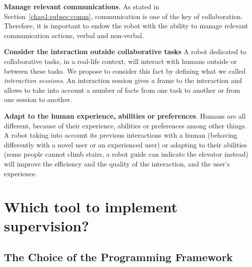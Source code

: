 \documentclass[a4paper,11pt,twoside]{StyleThese}
\begin{document}
\begin{bulletList}
	\item \textbf{Manage relevant communications}. As stated in Section~\ref{chap1:subsec:comm}, communication is one of the key of collaboration. Therefore, it is important to endow the robot with the ability to manage relevant communication actions, verbal and non-verbal.
	\item \textbf{Consider the interaction outside collaborative tasks} A robot dedicated to collaborative tasks, in a real-life context, will interact with humans outside or between these tasks. We propose to consider this fact by defining what we called \textit{interaction sessions}. An interaction session gives a frame to the interaction and allows to take into account a number of facts from one task to another or from one session to another.
	\item \textbf{Adapt to the human experience, abilities or preferences}. Humans are all different, because of their experience, abilities or preferences among other things. A robot taking into account its previous interactions with a human (\eg behaving differently with a novel user or an experienced user) or adapting to their abilities (\eg some people cannot climb stairs, a robot guide can indicate the elevator instead) will improve the efficiency and the quality of the interaction, and the user's experience.
\end{bulletList}


\section{Which tool to implement supervision?}\label{chap4:sec:bdi}


\subsection{The Choice of the Programming Framework}

\end{document}
